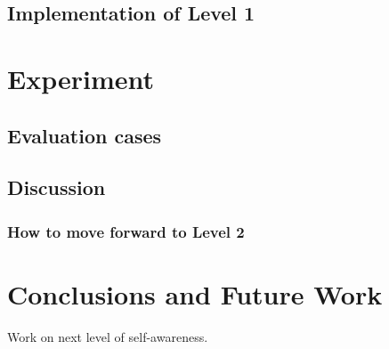 \documentclass[12pt]{article}
\begin{document}
\subsection{Implementation of Level 1}

\section{Experiment}
\subsection{Evaluation cases}
\subsection{Discussion}
\subsubsection{How to move forward to Level 2}


\section{Conclusions and Future Work}
Work on next level of self-awareness.
\end{document}
